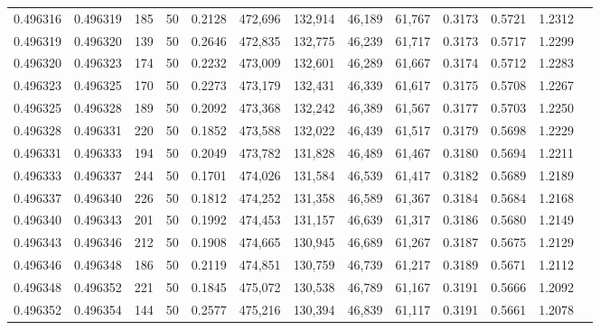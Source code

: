 \begin{tabular}{rrrrrrrrrrrrr}
0.496316 & 0.496319 &   185 &  50 &                                     0.2128 & 472,696 & 132,914 &  46,189 &  61,767 & 0.3173 & 0.5721 & 1.2312 \\
0.496319 & 0.496320 &   139 &  50 &                                     0.2646 & 472,835 & 132,775 &  46,239 &  61,717 & 0.3173 & 0.5717 & 1.2299 \\
0.496320 & 0.496323 &   174 &  50 &                                     0.2232 & 473,009 & 132,601 &  46,289 &  61,667 & 0.3174 & 0.5712 & 1.2283 \\
0.496323 & 0.496325 &   170 &  50 &                                     0.2273 & 473,179 & 132,431 &  46,339 &  61,617 & 0.3175 & 0.5708 & 1.2267 \\
0.496325 & 0.496328 &   189 &  50 &                                     0.2092 & 473,368 & 132,242 &  46,389 &  61,567 & 0.3177 & 0.5703 & 1.2250 \\
0.496328 & 0.496331 &   220 &  50 &                                     0.1852 & 473,588 & 132,022 &  46,439 &  61,517 & 0.3179 & 0.5698 & 1.2229 \\
0.496331 & 0.496333 &   194 &  50 &                                     0.2049 & 473,782 & 131,828 &  46,489 &  61,467 & 0.3180 & 0.5694 & 1.2211 \\
0.496333 & 0.496337 &   244 &  50 &                                     0.1701 & 474,026 & 131,584 &  46,539 &  61,417 & 0.3182 & 0.5689 & 1.2189 \\
0.496337 & 0.496340 &   226 &  50 &                                     0.1812 & 474,252 & 131,358 &  46,589 &  61,367 & 0.3184 & 0.5684 & 1.2168 \\
0.496340 & 0.496343 &   201 &  50 &                                     0.1992 & 474,453 & 131,157 &  46,639 &  61,317 & 0.3186 & 0.5680 & 1.2149 \\
0.496343 & 0.496346 &   212 &  50 &                                     0.1908 & 474,665 & 130,945 &  46,689 &  61,267 & 0.3187 & 0.5675 & 1.2129 \\
0.496346 & 0.496348 &   186 &  50 &                                     0.2119 & 474,851 & 130,759 &  46,739 &  61,217 & 0.3189 & 0.5671 & 1.2112 \\
0.496348 & 0.496352 &   221 &  50 &                                     0.1845 & 475,072 & 130,538 &  46,789 &  61,167 & 0.3191 & 0.5666 & 1.2092 \\
0.496352 & 0.496354 &   144 &  50 &                                     0.2577 & 475,216 & 130,394 &  46,839 &  61,117 & 0.3191 & 0.5661 & 1.2078 \\

\end{tabular}
